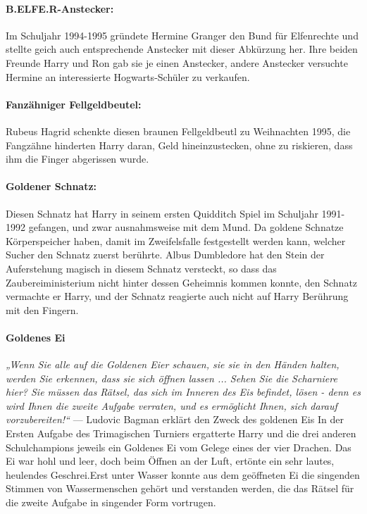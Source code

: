 \documentclass[a4paper, 10pt]{article}
\begin{document}
\paragraph{B.ELFE.R-Anstecker:}
Im Schuljahr 1994-1995 gründete Hermine Granger den Bund für Elfenrechte und stellte geich auch entsprechende Anstecker mit dieser Abkürzung her. Ihre beiden Freunde Harry und Ron gab sie je einen Anstecker, andere Anstecker versuchte Hermine an interessierte Hogwarts-Schüler zu verkaufen.
\paragraph{Fanzähniger Fellgeldbeutel:}
Rubeus Hagrid schenkte diesen braunen Fellgeldbeutl zu Weihnachten 1995, die Fangzähne hinderten Harry daran, Geld hineinzustecken, ohne zu riskieren, dass ihm die Finger abgerissen wurde.
\paragraph{Goldener Schnatz:}
Diesen Schnatz hat Harry in seinem ersten Quidditch Spiel im Schuljahr 1991-1992 gefangen, und zwar ausnahmsweise mit dem Mund. Da goldene Schnatze Körperspeicher haben, damit im Zweifelsfalle festgestellt werden kann, welcher Sucher den Schnatz zuerst berührte. Albus Dumbledore hat den Stein der Auferstehung magisch in diesem Schnatz versteckt, so dass das Zaubereiministerium nicht hinter dessen Geheimnis kommen konnte, den Schnatz vermachte er Harry, und der Schnatz reagierte auch nicht auf Harry Berührung mit den Fingern.

\paragraph{Goldenes Ei}
\textit{„Wenn Sie alle auf die Goldenen Eier schauen, sie sie in den Händen halten, werden Sie erkennen, dass sie sich öffnen lassen ... Sehen Sie die Scharniere hier? Sie müssen das Rätsel, das sich im Inneren des Eis befindet, lösen - denn es wird Ihnen die zweite Aufgabe verraten, und es ermöglicht Ihnen, sich darauf vorzubereiten!“}
\vspace{10pt}
\newline
{}  
— Ludovic Bagman erklärt den Zweck des goldenen Eis
\vspace{10pt}
\newline
{}  
In der Ersten Aufgabe des Trimagischen Turniers ergatterte Harry und die drei anderen Schulchampions jeweils ein Goldenes Ei vom Gelege eines der vier Drachen. Das Ei war hohl und leer, doch beim Öffnen an der Luft, ertönte ein sehr lautes, heulendes Geschrei.Erst unter Wasser konnte aus dem geöffneten Ei die singenden Stimmen von Wassermenschen gehört und verstanden werden, die das Rätsel für die zweite Aufgabe in singender Form vortrugen.
\end{document}

